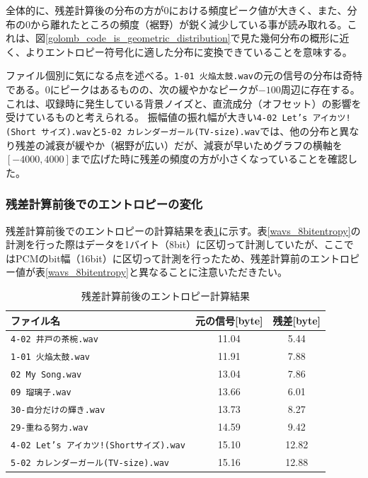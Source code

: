 \documentclass[uplatex,dvipdfmx,b5j,10pt]{jsbook}
\theoremstyle{definition}
\begin{document}
全体的に、残差計算後の分布の方が0における頻度ピーク値が大きく、また、分布の0から離れたところの頻度（裾野）が鋭く減少している事が読み取れる。これは、図\ref{golomb_code_is_geometric_distribution}で見た幾何分布の概形に近く、よりエントロピー符号化に適した分布に変換できていることを意味する。

ファイル個別に気になる点を述べる。\texttt{1-01 火焔太鼓.wav}の元の信号の分布は奇特である。0にピークはあるものの、次の緩やかなピークが$-100$周辺に存在する。これは、収録時に発生している背景ノイズと、直流成分（オフセット）の影響を受けているものと考えられる。
振幅値の振れ幅が大きい\texttt{4-02 Let’s アイカツ!(Short サイズ).wav}と\texttt{5-02 カレンダーガール(TV-size).wav}では、他の分布と異なり残差の減衰が緩やか（裾野が広い）だが、減衰が早いためグラフの横軸を$[-4000, 4000]$まで広げた時に残差の頻度の方が小さくなっていることを確認した。

\subsubsection{残差計算前後でのエントロピーの変化}

残差計算前後でのエントロピーの計算結果を表\ref{wavs_residual_16bitentropy}に示す。表\ref{wavs_8bitentropy}の計測を行った際はデータを1バイト（8bit）に区切って計測していたが、ここではPCMのbit幅（16bit）に区切って計測を行ったため、残差計算前のエントロピー値が表\ref{wavs_8bitentropy}と異なることに注意いただきたい。
\begin{table}[htbp]
  \begin{center}
    \caption{残差計算前後のエントロピー計算結果} \label{wavs_residual_16bitentropy}
    \begin{tabular}{|l|c|c|}
      \hline
      ファイル名 & 元の信号[byte] & 残差[byte] \\ \hline
      \texttt{4-02 井戸の茶椀.wav}                   & 11.04 &  5.44  \\ \hline
      \texttt{1-01 火焔太鼓.wav}                     & 11.91 &  7.88  \\ \hline
      \texttt{02 My Song.wav}                        & 13.04 &  7.86  \\ \hline
      \texttt{09 瑠璃子.wav}                         & 13.66 &  6.01  \\ \hline
      \texttt{30-自分だけの輝き.wav}                 & 13.73 &  8.27  \\ \hline
      \texttt{29-重ねる努力.wav}                     & 14.59 &  9.42  \\ \hline
      \texttt{4-02 Let's アイカツ!(Shortサイズ).wav} & 15.10 & 12.82  \\ \hline
      \texttt{5-02 カレンダーガール(TV-size).wav}    & 15.16 & 12.88  \\ \hline
    \end{tabular}
  \end{center}
\end{table}
\end{document}
